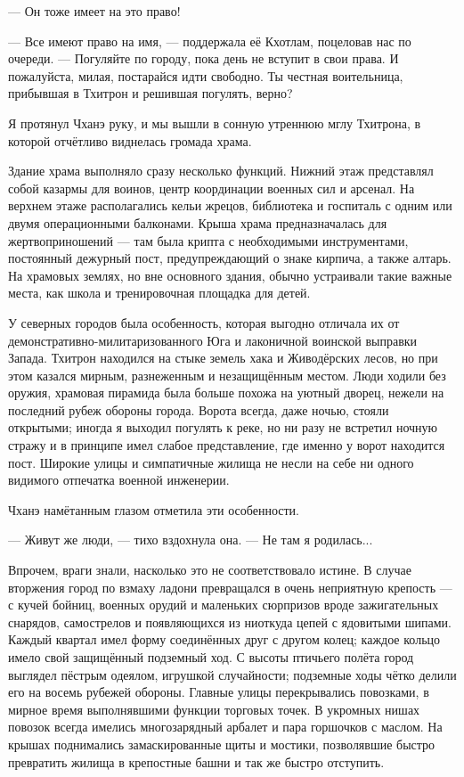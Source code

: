 --- Он тоже имеет на это право!

--- Все имеют право на имя, --- поддержала её Кхотлам, поцеловав нас по очереди.
--- Погуляйте по городу, пока день не вступит в свои права.
И пожалуйста, милая, постарайся идти свободно.
Ты честная воительница, прибывшая в Тхитрон и решившая погулять, верно?

Я протянул Чханэ руку, и мы вышли в сонную утреннюю мглу Тхитрона, в которой отчётливо виднелась громада храма.

Здание храма выполняло сразу несколько функций.
Нижний этаж представлял собой казармы для воинов, центр координации военных сил и арсенал.
На верхнем этаже располагались кельи жрецов, библиотека и госпиталь с одним или двумя операционными балконами.
Крыша храма предназначалась для жертвоприношений --- там была крипта с необходимыми инструментами, постоянный дежурный пост, предупреждающий о знаке кирпича, а также алтарь.
На храмовых землях, но вне основного здания, обычно устраивали такие важные места, как школа и тренировочная площадка для детей.

У северных городов была особенность, которая выгодно отличала их от демонстративно-милитаризованного Юга и лаконичной воинской выправки Запада.
Тхитрон находился на стыке земель хака и Живодёрских лесов, но при этом казался мирным, разнеженным и незащищённым местом.
Люди ходили без оружия, храмовая пирамида была больше похожа на уютный дворец, нежели на последний рубеж обороны города.
Ворота всегда, даже ночью, стояли открытыми;
иногда я выходил погулять к реке, но ни разу не встретил ночную стражу и в принципе имел слабое представление, где именно у ворот находится пост.
Широкие улицы и симпатичные жилища не несли на себе ни одного видимого отпечатка военной инженерии.

Чханэ намётанным глазом отметила эти особенности.

--- Живут же люди, --- тихо вздохнула она.
--- Не там я родилась...

Впрочем, враги знали, насколько это не соответствовало истине.
В случае вторжения город по взмаху ладони превращался в очень неприятную крепость --- с кучей бойниц, военных орудий и маленьких сюрпризов вроде зажигательных снарядов, самострелов и появляющихся из ниоткуда цепей с ядовитыми шипами.
Каждый квартал имел форму соединённых друг с другом колец;
каждое кольцо имело свой защищённый подземный ход.
С высоты птичьего полёта город выглядел пёстрым одеялом, игрушкой случайности;
подземные ходы чётко делили его на восемь рубежей обороны.
Главные улицы перекрывались повозками, в мирное время выполнявшими функции торговых точек.
В укромных нишах повозок всегда имелись многозарядный арбалет и пара горшочков с маслом.
На крышах поднимались замаскированные щиты и мостики, позволявшие быстро превратить жилища в крепостные башни и так же быстро отступить.

